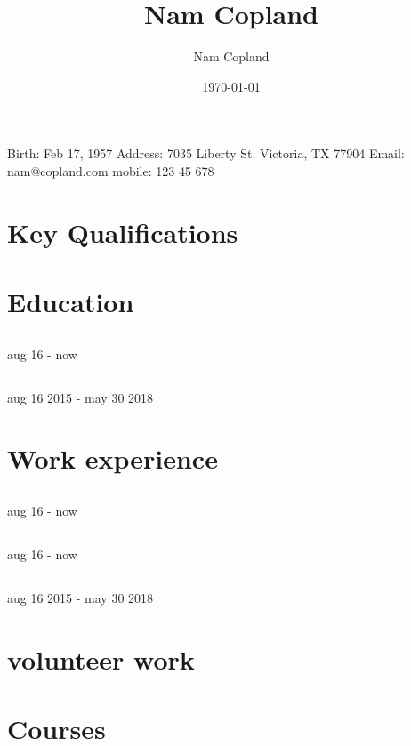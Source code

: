\documentclass{crudecv/crudecv}
\title{Nam Copland}
\author{Nam Copland}
\date{\today}
\begin{document}
\maketitle
Birth: Feb 17, 1957
Address: 7035 Liberty St. Victoria, TX 77904
Email: nam@copland.com
mobile: 123 45 678

\section{Key Qualifications}

\section{Education}
\subsection{\lipsum[2][1]}
\lipsum[2][2] aug 16 - now

\subsection{\lipsum[2][3]}
\lipsum[2][4] aug 16 2015 - may 30 2018

\section{Work experience}
\subsection{\lipsum[3][1]}
\lipsum[3][2] aug 16 - now

\subsection{\lipsum[3][3]}
\lipsum[3][4] aug 16 - now

\subsection{\lipsum[3][5]}
\lipsum[3][6] aug 16 2015 - may 30 2018

\section{volunteer work}

\section{Courses}
\end{document}

